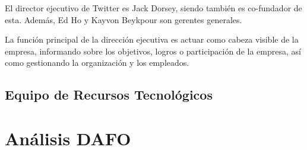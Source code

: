El director ejecutivo de Twitter es Jack Dorsey, siendo también es co-fundador de esta. Además, Ed Ho y Kayvon Beykpour son gerentes generales.


La función principal de la dirección ejecutiva es actuar como cabeza visible de la empresa, informando sobre los objetivos, logros o participación de la empresa, así como gestionando la organización y los empleados.

\subsection{Equipo de Recursos Tecnológicos}



\section{Análisis DAFO}


